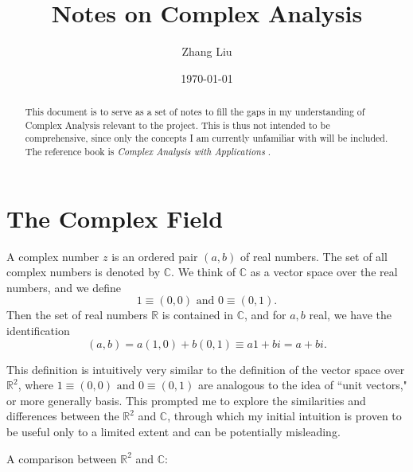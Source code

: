 \documentclass[11pt,reqno,oneside,a4paper]{article}
\author{Zhang Liu}
\title{Notes on Complex Analysis}
\date{\today}
\begin{document}
\maketitle
\thispagestyle{fancy}

\begin{abstract}
    This document is to serve as a set of notes to fill the gaps in my understanding of Complex Analysis relevant to the project. This is thus not intended to be comprehensive, since only the concepts I am currently unfamiliar with will be included. The reference book is \textit{Complex Analysis with Applications} \cite{AG2010a}.
\end{abstract}


\section{The Complex Field} \label{sec:ComplexField}

\begin{defn}
	A complex number $z$ is an ordered pair $(a,b)$ of real numbers. The set of all complex numbers is denoted by $\mathbb{C}$. We think of $\mathbb{C}$ as a vector space over the real numbers, and we define 
	$$1 \equiv (0,0) \text{ and } 0 \equiv (0,1).$$
	Then the set of real numbers $\mathbb{R}$ is contained in $\mathbb{C}$, and for $a,b$ real, we have the identification
	$$(a,b) = a(1,0) + b(0,1) \equiv a1+bi = a + bi.$$
\end{defn}

\par This definition is intuitively very similar to the definition of the vector space over $\mathbb{R}^2$, where $1 \equiv (0,0) \text{ and } 0 \equiv (0,1)$ are analogous to the idea of ``unit vectors," or more generally basis. This prompted me to explore the similarities and differences between the $\mathbb{R}^2$ and $\mathbb{C}$, through which my initial intuition is proven to be useful only to a limited extent and can be potentially misleading. 

A comparison between $\mathbb{R}^2$ and $\mathbb{C}$:
\end{document}
